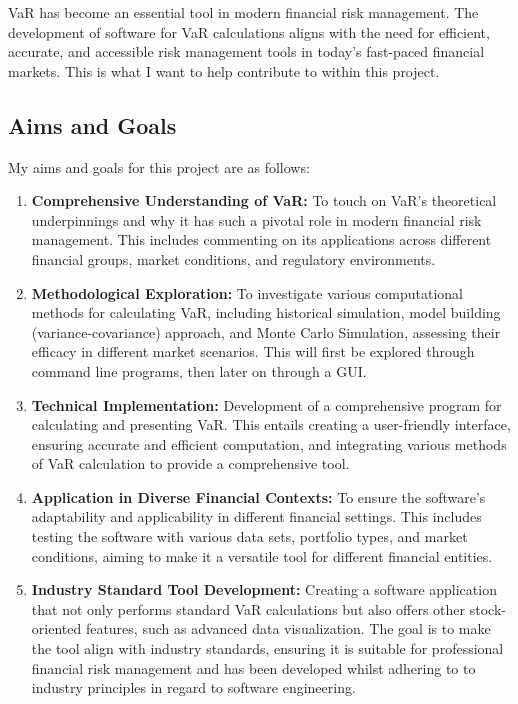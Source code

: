 \documentclass{article}
\begin{document}
VaR has become an essential tool in modern financial risk management. The development of software for VaR calculations aligns with the need for efficient, accurate, and accessible risk management tools in today's fast-paced financial markets. This is what I want to help contribute to within this project.\\

\subsection{Aims and Goals}
My aims and goals for this project are as follows:

\begin{enumerate}
    \item \textbf{Comprehensive Understanding of VaR:} To touch on VaR's theoretical underpinnings and why it has such a pivotal role in modern financial risk management. This includes commenting on its applications across different financial groups, market conditions, and regulatory environments.
    
    \item \textbf{Methodological Exploration:} To investigate various computational methods for calculating VaR, including historical simulation, model building (variance-covariance) approach, and Monte Carlo Simulation, assessing their efficacy in different market scenarios. This will first be explored through command line programs, then later on through a GUI\@.
    
    \item \textbf{Technical Implementation:} Development of a comprehensive program for calculating and presenting VaR. This entails creating a user-friendly interface, ensuring accurate and efficient computation, and integrating various methods of VaR calculation to provide a comprehensive tool.
    
    \item \textbf{Application in Diverse Financial Contexts:} To ensure the software's adaptability and applicability in different financial settings. This includes testing the software with various data sets, portfolio types, and market conditions, aiming to make it a versatile tool for different financial entities.
    
    \item \textbf{Industry Standard Tool Development:} Creating a software application that not only performs standard VaR calculations but also offers other stock-oriented features, such as advanced data visualization. The goal is to make the tool align with industry standards, ensuring it is suitable for professional financial risk management and has been developed whilst adhering to to industry principles in regard to software engineering.
\end{enumerate}
\end{document}
